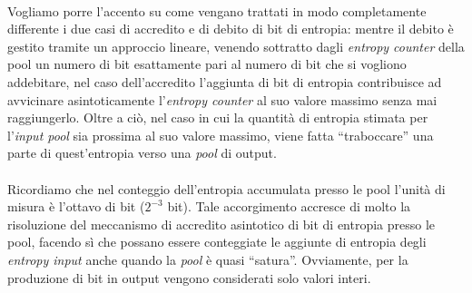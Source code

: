 \documentclass{article}
\begin{document}
 \paragraph{}Vogliamo porre l'accento su come vengano trattati in modo
 completamente differente i due casi di accredito e di debito di bit di
 entropia: mentre il debito è gestito tramite un approccio lineare, venendo
 sottratto dagli \emph{entropy counter} della pool un numero di bit esattamente
 pari al numero di bit che si vogliono addebitare, nel caso dell'accredito
 l'aggiunta di bit di entropia contribuisce ad avvicinare asintoticamente
 l'\emph{entropy counter} al suo valore massimo senza mai raggiungerlo. Oltre a
 ciò, nel caso in cui la quantità di entropia stimata per l'\emph{input pool}
 sia prossima al suo valore massimo, viene fatta ``traboccare'' una parte di
 quest'entropia verso una \emph{pool} di output.
 \paragraph{}Ricordiamo che nel conteggio dell'entropia accumulata presso le
 pool l'unità di misura è l'ottavo di bit ($2^{-3}$ bit). Tale accorgimento
 accresce di molto la risoluzione del meccanismo di accredito asintotico di
 bit di entropia presso le pool, facendo sì che possano essere conteggiate
 le aggiunte di entropia degli \emph{entropy input} anche quando la \emph{pool}
 è quasi ``satura''. Ovviamente, per la produzione di bit in output
 vengono considerati solo valori interi.
 
\end{document}
